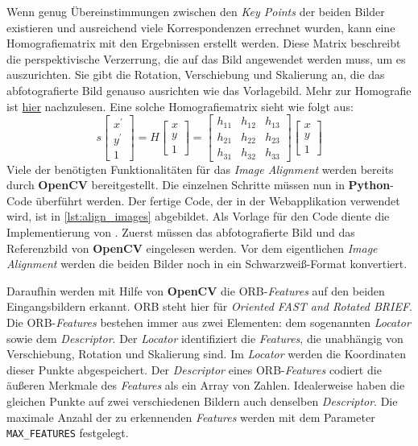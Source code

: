 Wenn genug Übereinstimmungen zwischen den \textit{Key Points} der beiden Bilder existieren und ausreichend viele Korrespondenzen errechnet wurden, kann eine 
Homografiematrix mit den Ergebnissen erstellt werden. Diese Matrix beschreibt die perspektivische Verzerrung, die auf das Bild angewendet werden muss, um es
auszurichten. Sie gibt die Rotation, Verschiebung und Skalierung an, die das abfotografierte Bild genauso ausrichten wie das Vorlagebild. Mehr zur Homografie
ist \hyperref{https://docs.opencv.org/4.x/d9/dab/tutorial_homography.html}{}{}{hier} nachzulesen.\cite{rosebrock} Eine solche Homografiematrix sieht wie folgt aus:
\[s \begin{bmatrix} x^{'} \\ y^{'} \\ 1 \end{bmatrix} 
= H \begin{bmatrix} x \\ y \\ 1 \end{bmatrix} 
= \begin{bmatrix} h_{11} & h_{12} & h_{13} \\ h_{21} & h_{22} & h_{23} \\ h_{31} & h_{32} & h_{33} \end{bmatrix} 
\begin{bmatrix} x \\ y \\ 1 \end{bmatrix}\]
Viele der benötigten Funktionalitäten für das \textit{Image Alignment} werden bereits durch \textbf{OpenCV} bereitgestellt.
Die einzelnen Schritte müssen nun in \textbf{Python}-Code überführt werden. Der fertige Code, der in der Webapplikation verwendet wird, ist in \ref{lst:align_images}
abgebildet. Als Vorlage für den Code diente die Implementierung von \citeauthor{rosebrock}. Zuerst müssen das abfotografierte Bild und das Referenzbild
von \textbf{OpenCV} eingelesen werden. Vor dem eigentlichen \textit{Image Alignment} werden die beiden Bilder noch in ein Schwarzweiß-Format konvertiert.

Daraufhin werden mit Hilfe von \textbf{OpenCV} die ORB-\textit{Features} auf den beiden Eingangsbildern erkannt.
ORB steht hier für \textit{Oriented FAST and Rotated BRIEF}. Die ORB-\textit{Features} bestehen immer aus zwei Elementen: dem sogenannten 
\textit{Locator} sowie dem \textit{Descriptor}. Der \textit{Locator} identifiziert die \textit{Features}, die unabhängig von Verschiebung, Rotation und Skalierung
sind. Im \textit{Locator} werden die Koordinaten dieser Punkte abgespeichert. Der \textit{Descriptor} eines ORB-\textit{Features} codiert die äußeren Merkmale
des \textit{Features} als ein Array von Zahlen. Idealerweise haben die gleichen Punkte auf zwei verschiedenen Bildern auch denselben \textit{Descriptor}.
Die maximale Anzahl der zu erkennenden \textit{Features} werden mit dem Parameter \texttt{MAX\_FEATURES} festgelegt.

